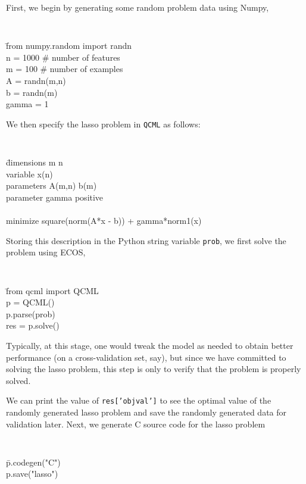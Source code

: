 \documentclass[11pt]{article}
\def\qcml{\texttt{QCML}\xspace}
\begin{document}
First, we begin by generating some random problem data using Numpy,
{\tt
\begin{tabbing}
\qquad \= from numpy.random import randn\\
\> n = 1000    \# number of features\\
\> m = 100     \# number of examples\\
\> A = randn(m,n)\\
\> b = randn(m)\\
\> gamma = 1
\end{tabbing}
}
\noindent We then specify the lasso problem in \qcml as follows:
{\tt
\begin{tabbing}
\qquad
\= dimensions m n \\
\> variable x(n) \\
\> parameters A(m,n) b(m)\\
\> parameter gamma positive\\
\\
\> minimize square(norm(A*x - b)) + gamma*norm1(x)
\end{tabbing}
}
\noindent Storing this description in the Python string variable {\tt prob},
we first solve the problem using ECOS,
{\tt
\begin{tabbing}
\qquad \= from qcml import QCML\\
\> p = QCML()\\
\> p.parse(prob)\\
\> res = p.solve()
\end{tabbing}
}
\noindent Typically, at this stage, one would tweak the model as needed to
obtain better performance (on a cross-validation set, say), but since we
have committed to solving the lasso problem, this step is only to verify that
the problem is properly solved.

We can print the value of {\tt res['objval']} to see the optimal
value of the randomly generated lasso problem and save the randomly generated
data for validation later. Next, we generate C source
code for the lasso problem
{\tt
\begin{tabbing}
\qquad \= p.codegen("C")\\
\> p.save("lasso")
\end{tabbing}
}
\end{document}
